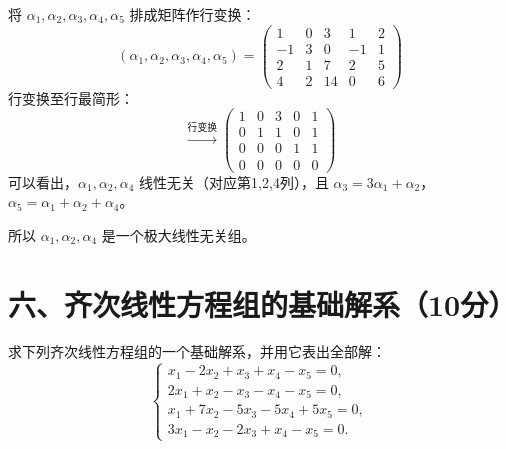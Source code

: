 \documentclass[lang=cn,12pt]{elegantbook}
\begin{document}
\begin{solution}[(2)]
将 $\alpha_1, \alpha_2, \alpha_3, \alpha_4, \alpha_5$ 排成矩阵作行变换：
\[
(\alpha_1, \alpha_2, \alpha_3, \alpha_4, \alpha_5) = 
\begin{pmatrix}
1 & 0 & 3 & 1 & 2 \\
-1 & 3 & 0 & -1 & 1 \\
2 & 1 & 7 & 2 & 5 \\
4 & 2 & 14 & 0 & 6
\end{pmatrix}
\]
行变换至行最简形：
\[
\xrightarrow{\text{行变换}} 
\begin{pmatrix}
1 & 0 & 3 & 0 & 1 \\
0 & 1 & 1 & 0 & 1 \\
0 & 0 & 0 & 1 & 1 \\
0 & 0 & 0 & 0 & 0
\end{pmatrix}
\]
可以看出，$\alpha_1, \alpha_2, \alpha_4$ 线性无关（对应第1,2,4列），且 $\alpha_3 = 3\alpha_1 + \alpha_2$，$\alpha_5 = \alpha_1 + \alpha_2 + \alpha_4$。

所以 $\alpha_1, \alpha_2, \alpha_4$ 是一个极大线性无关组。
\end{solution}

\section*{六、齐次线性方程组的基础解系（10分）}

\begin{example}
求下列齐次线性方程组的一个基础解系，并用它表出全部解：
\[
\begin{cases} 
x_1 - 2x_2 + x_3 + x_4 - x_5 = 0, \\ 
2x_1 + x_2 - x_3 - x_4 - x_5 = 0, \\ 
x_1 + 7x_2 - 5x_3 - 5x_4 + 5x_5 = 0, \\ 
3x_1 - x_2 - 2x_3 + x_4 - x_5 = 0. 
\end{cases}
\]
\end{example}
\end{document}

